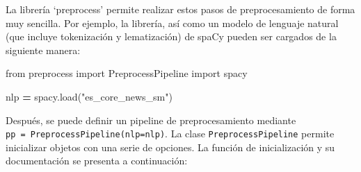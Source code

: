 \documentclass[
  spanish,
]{article}
\newenvironment{Shaded}{\begin{snugshade}}{\end{snugshade}}
\newcommand{\ImportTok}[1]{#1}
\newcommand{\NormalTok}[1]{#1}
\newcommand{\OperatorTok}[1]{\textcolor[rgb]{0.81,0.36,0.00}{\textbf{#1}}}
\newcommand{\StringTok}[1]{\textcolor[rgb]{0.31,0.60,0.02}{#1}}
\begin{document}
La librería `preprocess' permite realizar estos pasos de
preprocesamiento de forma muy sencilla. Por ejemplo, la librería, así
como un modelo de lenguaje natural (que incluye tokenización y
lematización) de spaCy pueden ser cargados de la siguiente manera:

\begin{Shaded}
\begin{Highlighting}[]
\ImportTok{from}\NormalTok{ preprocess }\ImportTok{import}\NormalTok{ PreprocessPipeline}
\ImportTok{import}\NormalTok{ spacy}

\NormalTok{nlp }\OperatorTok{=}\NormalTok{ spacy.load(}\StringTok{"es\_core\_news\_sm"}\NormalTok{)}
\end{Highlighting}
\end{Shaded}

Después, se puede definir un pipeline de preprocesamiento mediante
\texttt{pp\ =\ PreprocessPipeline(nlp=nlp)}. La clase
\texttt{PreprocessPipeline} permite inicializar objetos con una serie de
opciones. La función de inicialización y su documentación se presenta a
continuación:
\end{document}
